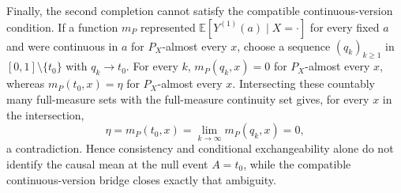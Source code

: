 Finally, the second completion cannot satisfy the compatible continuous-version condition. If a function \(m_P\) represented \(\mathbb E[Y^{(1)}(a)\mid X=\cdot]\) for every fixed \(a\) and were continuous in \(a\) for \(P_X\)-almost every \(x\), choose a sequence \((q_k)_{k\ge1}\) in \([0,1]\setminus\{t_0\}\) with \(q_k\to t_0\). For every \(k\), \(m_P(q_k,x)=0\) for \(P_X\)-almost every \(x\), whereas \(m_P(t_0,x)=\eta\) for \(P_X\)-almost every \(x\). Intersecting these countably many full-measure sets with the full-measure continuity set gives, for every \(x\) in the intersection,
\[
\eta=m_P(t_0,x)=\lim_{k\to\infty}m_P(q_k,x)=0,
\]
a contradiction. Hence consistency and conditional exchangeability alone do not identify the causal mean at the null event \(A=t_0\), while the compatible continuous-version bridge closes exactly that ambiguity.
